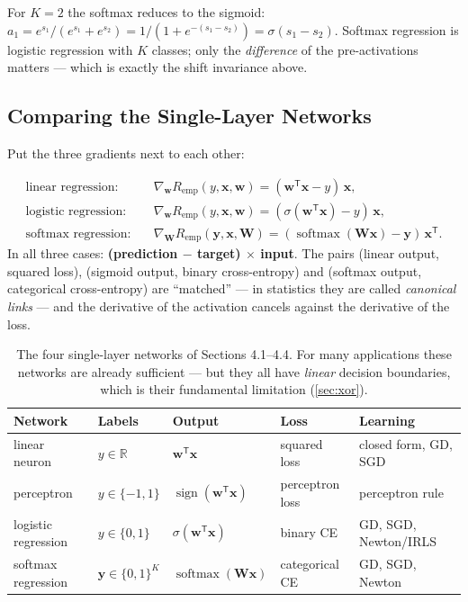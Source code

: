 \documentclass[11pt, oneside]{book}
\newcommand{\R}{\mathbb{R}}
\newcommand{\grad}{\nabla}               %
\newcommand{\T}{^{\mathsf{T}}}           %
\DeclareMathOperator{\softmax}{softmax}
\DeclareMathOperator{\sign}{sign}
\newcommand{\bx}{\bm{x}}        \newcommand{\by}{\bm{y}}
\newcommand{\bw}{\bm{w}}        \newcommand{\bW}{\bm{W}}
\newcommand{\Remp}{R_{\mathrm{emp}}}     %
\let\originalsubsection\subsection
\renewcommand{\subsection}{\Needspace{6\baselineskip}\originalsubsection}
\begin{document}
\begin{intbox}
For $K = 2$ the softmax reduces to the sigmoid:
$a_1 = e^{s_1}/(e^{s_1} + e^{s_2}) = 1/(1 + e^{-(s_1 - s_2)}) = \sigma(s_1 -
s_2)$. Softmax regression is logistic regression with $K$ classes; only the
\emph{difference} of the pre-activations matters --- which is exactly the
shift invariance above.
\end{intbox}

\subsection{Comparing the Single-Layer Networks}

Put the three gradients next to each other:

\begin{thmbox}[title={Same gradient, three models}]
\begin{align*}
  \text{linear regression:}  \quad & \grad_{\bw}\Remp(y, \bx, \bw) = (\bw\T\bx - y)\,\bx, \\
  \text{logistic regression:}\quad & \grad_{\bw}\Remp(y, \bx, \bw) = (\sigma(\bw\T\bx) - y)\,\bx, \\
  \text{softmax regression:} \quad & \grad_{\bW}\Remp(\by, \bx, \bW) = (\softmax(\bW\bx) - \by)\,\bx\T .
\end{align*}
In all three cases: \textbf{(prediction $-$ target) $\times$ input}. The
pairs (linear output, squared loss), (sigmoid output, binary cross-entropy)
and (softmax output, categorical cross-entropy) are ``matched'' --- in
statistics they are called \emph{canonical links} --- and the derivative of
the activation cancels against the derivative of the loss.
\end{thmbox}

\begin{table}[htbp]
\centering
\small
\begin{tabular}{@{}lllll@{}}
\toprule
\textbf{Network} & \textbf{Labels} & \textbf{Output} & \textbf{Loss} & \textbf{Learning} \\
\midrule
linear neuron & $y \in \R$ & $\bw\T\bx$ & squared loss &
  closed form, GD, SGD \\
perceptron & $y \in \{-1, 1\}$ & $\sign(\bw\T\bx)$ & perceptron loss &
  perceptron rule \\
logistic regression & $y \in \{0, 1\}$ & $\sigma(\bw\T\bx)$ & binary CE &
  GD, SGD, Newton/IRLS \\
softmax regression & $\by \in \{0,1\}^K$ & $\softmax(\bW\bx)$ & categorical CE &
  GD, SGD, Newton \\
\bottomrule
\end{tabular}
\caption{The four single-layer networks of Sections 4.1--4.4. For many
applications these networks are already sufficient --- but they all have
\emph{linear} decision boundaries, which is their fundamental limitation
(\cref{sec:xor}).}
\label{tab:single-layer}
\end{table}
\end{document}
